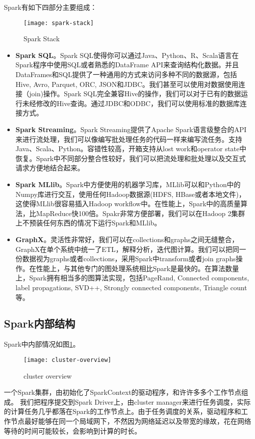 Spark有如下四部分主要组成：
\begin{figure}[ht]
\centering
\texttt{[image: spark-stack]}
\caption{Spark Stack}
\end{figure}
\begin{itemize}
    \item \textbf{Spark SQL}。Spark SQL使得你可以通过Java、Python、R、Scala语言在Spark程序中使用SQL或者熟悉的DataFrame API来查询结构化数据。并且DataFrames和SQL提供了一种通用的方式来访问多种不同的数据源，包括Hive, Avro, Parquet, ORC, JSON和JDBC。我们甚至可以使用对数据使用连接（join)操作。Spark SQL完全兼容Hive的操作，我们可以对于已有的数据运行未经修改的Hive查询。通过JDBC和ODBC，我们可以使用标准的数据库连接方式。
    \item \textbf{Spark Streaming}。Spark Streaming提供了Apache Spark语言级整合的API来进行流处理，我们可以像编写批处理任务的代码一样来编写流任务。支持Java、Scala、Python。容错性较高，开箱支持从lost work和operator state中恢复。Spark中不同部分整合性较好，我们可以把流处理和批处理以及交互式请求方便地结合起来。
    \item \textbf{Spark MLlib}。Spark中方便使用的机器学习库，MLlib可以和Python中的Numpy库进行交互，使用任何Hadoop数据源(HDFS, HBase或者本地文件)，这使得MLlib很容易插入Hadoop workflow中。在性能上，Spark中的高质量算法，比MapReduce快100倍。Spakr非常方便部署，我们可以在Hadoop 2集群上不预装任何东西的情况下运行Spark和MLlib。
    \item \textbf{GraphX}。灵活性非常好，我们可以在collections和graphs之间无缝整合，GraphX在单个系统中统一了ETL，解释分析，迭代图计算。我们可以把同一份数据视为graphs或者collections，采用Spark中transform或者join graphs操作。在性能上，与其他专门的图处理系统相比Spark是最快的。在算法数量上，Spark拥有相当多的图算法实现，包括PageRand, Connected components, label propagations, SVD++, Strongly connected components, Triangle count等。
\end{itemize}

\subsection{Spark内部结构}
Spark中内部情况如图\ref{fig:clusterOverview}。
\begin{figure}[ht]
\centering
\texttt{[image: cluster-overview]}
\caption{cluster overview}\label{fig:clusterOverview}
\end{figure}
一个Spark集群，由初始化了SparkContext的驱动程序，和许许多多个工作节点组成。
我们把程序提交到Spark Driver上，由cluster manager来进行任务调度，实际的计算任务几乎都落在Spark的工作节点上。由于任务调度的关系，驱动程序和工作节点最好能够在同一个局域网下，不然因为网络延迟以及带宽的缘故，花在网络等待的时间可能较长，会影响到计算的时长。
